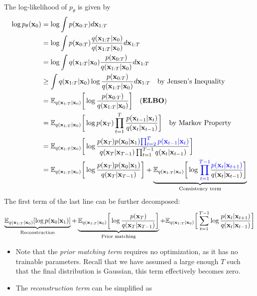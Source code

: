 The log-likelihood of $p_\theta$ is given by
\begin{align}
\log p_\theta({\mathbf{x}}_0) &=  \log\int p({\mathbf{x}}_{0:T})d{\mathbf{x}}_{1:T}\\
	&= \log\int p({\mathbf{x}}_{0:T})\frac{q({\mathbf{x}}_{1:T}|{\mathbf{x}}_0)}{q({\mathbf{x}}_{1:T}|{\mathbf{x}}_0)}d{\mathbf{x}}_{1:T}\\
	&= \log\int q({\mathbf{x}}_{1:T}|{\mathbf{x}}_0)\frac{p({\mathbf{x}}_{0:T})}{q({\mathbf{x}}_{1:T}|{\mathbf{x}}_0)}d{\mathbf{x}}_{1:T}\\
	&\geq \int q({\mathbf{x}}_{1:T}|{\mathbf{x}}_0)\log\frac{p({\mathbf{x}}_{0:T})}{q({\mathbf{x}}_{1:T}|{\mathbf{x}}_0)}d{\mathbf{x}}_{1:T}\quad \text{by Jensen's Inequality}\\
	&= \mathbb{E}_{q({\mathbf{x}}_{1:T}|{\mathbf{x}}_0)}\bigg[\log\frac{p({\mathbf{x}}_{0:T})}{q({\mathbf{x}}_{1:T}|{\mathbf{x}}_0)}\bigg] \quad (\textbf{ELBO})\\
	&= \mathbb{E}_{q({\mathbf{x}}_{1:T}|{\mathbf{x}}_0)}\bigg[\log p({\mathbf{x}}_T)\prod_{t=1}^T\frac{p({\mathbf{x}}_{t-1}|{\mathbf{x}}_t)}{q({\mathbf{x}}_{t}|{\mathbf{x}}_{t-1})}\bigg]\quad \text{by Markov Property}\\
	&= \mathbb{E}_{q({\mathbf{x}}_{1:T}|{\mathbf{x}}_0)}\bigg[\log \frac{p({\mathbf{x}}_T)p({\mathbf{x}}_0|{\mathbf{x}}_{1})\textcolor{blue}{\prod_{t=2}^{T} p({\mathbf{x}}_{t-1}|{\mathbf{x}}_{t})}}{q({\mathbf{x}}_T|{\mathbf{x}}_{T-1})\prod_{t=1}^{T-1}  q({\mathbf{x}}_{t}|{\mathbf{x}}_{t-1})}\bigg]\\
	&= \mathbb{E}_{q({\mathbf{x}}_{1:T}|{\mathbf{x}}_0)}\bigg[\log \frac{p({\mathbf{x}}_T)p({\mathbf{x}}_0|{\mathbf{x}}_{1})}{q({\mathbf{x}}_T|{\mathbf{x}}_{T-1})}\bigg] + \underbrace{\mathbb{E}_{q({\mathbf{x}}_{1:T}|{\mathbf{x}}_0)}\bigg[\log \textcolor{blue}{\prod_{t=1}^{T-1}}\frac{\textcolor{blue}{p({\mathbf{x}}_{t}|{\mathbf{x}}_{t+1})}}{q({\mathbf{x}}_{t}|{\mathbf{x}}_{t-1})}\bigg]}_{\text{Consistency term}}
\end{align}
The first term of the last line can be further decomposed:
\begin{align*}
	\underbrace{\mathbb{E}_{q({\mathbf{x}}_{1:T}|{\mathbf{x}}_0)}[\log p({\mathbf{x}}_0|{\mathbf{x}}_{1})]}_{\text{Reconstruction}}+\underbrace{\mathbb{E}_{q({\mathbf{x}}_{1:T}|{\mathbf{x}}_0)}\bigg[\log \frac{p({\mathbf{x}}_T)}{q({\mathbf{x}}_T|{\mathbf{x}}_{T-1})}\bigg]}_{\text{Prior matching}}+\mathbb{E}_{q({\mathbf{x}}_{1:T}|{\mathbf{x}}_0)}\bigg[\sum_{t=1}^{T-1}\log \frac{ p({\mathbf{x}}_{t}|{\mathbf{x}}_{t+1})}{q({\mathbf{x}}_{t}|{\mathbf{x}}_{t-1})}\bigg]
\end{align*}
\begin{itemize}
	\item Note that the \textit{prior matching term} requires no optimization, as it has no trainable parameters. Recall that we have assumed a large enough $T$ such that the final distribution is Gaussian, this term effectively becomes zero.
	\item The \textit{reconstruction term} can be simplified as 
\end{itemize}

